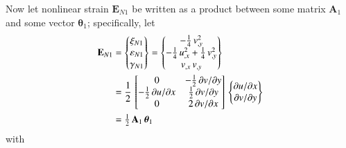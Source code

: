 Now let nonlinear strain $\boldsymbol{E}_{N1}$ be written as a product between some matrix $\mathbf{A}_1$ and some vector $\boldsymbol{\theta}_1$; specifically, let
\begin{equation}
\begin{aligned}
\mathbf{E}_{N1} & =  \begin{Bmatrix}
\mathrm \xi_{N1} \\
\mathrm \varepsilon_{N1} \\
\mathrm \gamma_{N1} \end{Bmatrix} =
\begin{Bmatrix}
 - \tfrac{1}{4} \, v_{,y}^2 \\
-\tfrac{1}{4} \, u_{,x}^2 + \tfrac{1}{4} \, v_{,y}^2 \\
 v_{,x} \, v_{,y} \end{Bmatrix} \notag \\
& = \frac{1}{2} \, \begin{bmatrix}
0 &  - \tfrac{1}{2} \, \partial v / \partial y \\
-\tfrac{1}{2} \, \partial u / \partial x &  \tfrac{1}{2} \, \partial v / \partial y \\
0  & 2 \, \partial v / \partial x  \end{bmatrix} \, \begin{Bmatrix}
\partial u / \partial x\\
\partial v / \partial y
\end{Bmatrix}\\
& = \tfrac{1}{2} \, \mathbf{A}_1 \, \boldsymbol{\theta}_1
\end{aligned}
\end{equation}
with 
